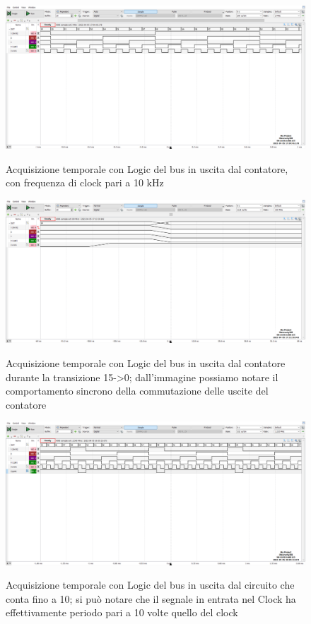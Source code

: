 \documentclass[10pt, a4paper, italian]{article}
\begin{document}
\begin{figure}
	\includegraphics[width=\textwidth]{5.b}
	\label{fig: Count_Clock}
	\caption{Acquisizione temporale con Logic del bus in uscita dal contatore, con frequenza di clock pari a 10 kHz}
\end{figure}
\begin{figure}
	\includegraphics[width=\textwidth]{5.d}
	\label{fig: Count_150}
	\caption{Acquisizione temporale con Logic del bus in uscita dal contatore durante la transizione 15->0; dall'immagine possiamo notare il comportamento sincrono della commutazione delle uscite del contatore}
\end{figure}
\begin{figure}
	\includegraphics[width=\textwidth]{5.e}
	\label{fig: Count_10th}
	\caption{Acquisizione temporale con Logic del bus in uscita dal circuito che conta fino a 10; si può notare che il segnale in entrata nel Clock ha effettivamente periodo pari a 10 volte quello del clock}
\end{figure}
\end{document}
